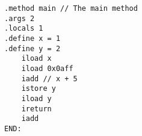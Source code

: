 \documentclass{article}
\begin{document}
  \begin{verbatim}
.method main // The main method
.args 2
.locals 1
.define x = 1
.define y = 2
    iload x
    iload 0x0aff
    iadd // x + 5
    istore y
    iload y
    ireturn
    iadd
END:
  \end{verbatim}
\end{document}
